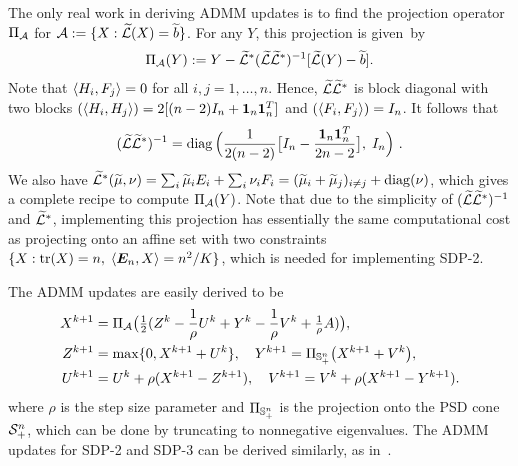 The only real work in deriving ADMM updates is to find the projection operator $\Pi_{\mathcal{A}}$ for $ \mathcal{A} := \{X: \widetilde{\mathcal{L}}(X) = \widetilde{b}\}$. For any $Y$, this projection is given~by 
\begin{align}\label{eq:proj:L:Y}
  \Pi_{\mathcal{A}}(Y) := Y - \widetilde{\mathcal{L}}^* (\widetilde{\mathcal{L}} \widetilde{\mathcal{L}}^*)^{-1}[ \widetilde{\mathcal{L}}(Y) - \widetilde{b}] .
\end{align}
Note that $\langle H_i,F_j\rangle = 0$ for all $i,j = 1, \dots, n$. Hence, $\widetilde{\mathcal{L}} \widetilde{\mathcal{L}}^*$ is block diagonal with two blocks $(\langle H_i,H_j\rangle) = 2[(n-2) I_n + \bm{1}_n \bm{1}_n^T]$ and 
$(\langle F_i,F_j\rangle) = I_n$. It follows that
\begin{align*}
  (\widetilde{\mathcal{L}}\widetilde{\mathcal{L}}^*)^{-1} = \operatorname{diag}\Big(\frac{1}{2(n-2)} 
    \big[ I_n - \frac{\bm{1}_n \bm{1}_n^T}{2n-2} \big],\; I_n \Big) \ . 
\end{align*}
We also have $\widetilde{\mathcal{L}}^*(\widetilde{\mu},\nu) = \sum_i \widetilde{\mu}_i E_i + \sum_i \nu_i F_i =
(\widetilde{\mu}_i + \widetilde{\mu}_j)_{i \neq j} + \operatorname{diag}(\nu)$, which gives a complete
recipe to compute $\Pi_{\mathcal{A}}(Y)$. Note that due to the simplicity of
$(\widetilde{\mathcal{L}} \widetilde{\mathcal{L}}^*)^{-1}$ and $\widetilde{\mathcal{L}}^*$, implementing this projection has
essentially the same computational cost as projecting onto an affine set with two constraints $\{X: \operatorname*{tr}(X) = n,\; \langle \bm{E}_n,X\rangle = n^2/K\}$, which is needed for implementing SDP-2. 


The ADMM updates are easily derived to be
\begin{align*}
  X^{k+1} &= \proj_{\Ac}\big(\tfrac12
  ( Z^k - \frac{1}{\rho}U^k + Y^k - \frac{1}{\rho} V^k +\tfrac1\rho A) \big) , \\
  Z^{k+1}
  &= %
  \max\{0,X^{k+1} + U^k\}, \quad 
  Y^{k+1} = \proj_{\psd{n}} \big(X^{k+1} + V^k\big), \\
  U^{k+1} &= U^{k} + \rho(X^{k+1}-Z^{k+1}), \quad 
  V^{k+1} = V^{k} + \rho(X^{k+1}-Y^{k+1}).
\end{align*}
where $\rho$ is the step size parameter and $\Pi_{\mathbb{S}^{n}_+}$ is the projection onto the PSD cone $\mathcal{S}_+^n$,
which can be done by truncating to nonnegative eigenvalues. The ADMM
updates for SDP-2 and SDP-3 can be derived similarly, as in~\cite{Cai2014}.



